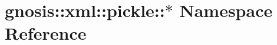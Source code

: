 \hypertarget{namespacegnosis_1_1xml_1_1pickle_1_1_5}{
\section{gnosis::xml::pickle::$\ast$ Namespace Reference}
\label{namespacegnosis_1_1xml_1_1pickle_1_1_5}
}


